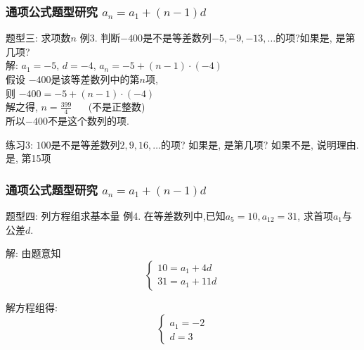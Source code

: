 \documentclass[12pt]{beamer}
\begin{document}
		\begin{frame}\frametitle{通项公式题型研究 \hspace{40pt} \alert{$a_n=a_1+(n-1)d$}}
		    
		\begin{block}{题型三: 求项数$n$}\pause
			\textcolor[rgb]{0.15,0.7,0.15}{例3.} 判断$-400$是不是等差数列$-5, -9, -13, \ldots$的项?如果是, 是第几项? \\ \pause
			{\color{cyan} 解: $a_1=-5$, \pause $d=-4$, \pause $a_n=-5+(n-1)\cdot(-4)$\\ \pause
			假设 $-400$是该等差数列中的第$n$项, \\ \pause
			则 $-400=-5+(n-1)\cdot(-4)$ \\ \pause
			解之得, $n=\frac{399}{4} \hspace{20pt}$(不是正整数) \\ \pause
			所以$-400$不是这个数列的项. 
			}
			\pause

			\textcolor[rgb]{0.15,0.7,0.15}{练习3: } $100$是不是等差数列$2, 9, 16, \ldots$的项? 如果是, 是第几项? 如果不是, 说明理由. \\ \pause
			{\color{cyan} 是, 第15项}
		\end{block}
		
		\end{frame}



		\begin{frame}\frametitle{通项公式题型研究 \hspace{40pt} \alert{$a_n=a_1+(n-1)d$}}
		    
		\begin{block}{题型四: 列方程组求基本量}\pause
			\textcolor[rgb]{0.15,0.7,0.15}{例4.} 在等差数列中,已知$a_5=10, a_{12}=31$, 求首项$a_1$与公差$d$. \\ \pause

			{\color{cyan} 解: 由题意知\\
			\[ \left\{ 
				\begin{array}{l}
					10=a_1+4d\\
					31=a_1+11d
				\end{array}
				\right. \] \pause

			解方程组得:\\
			\[ \left\{ 
				\begin{array}{l}
					a_1=-2\\
					d=3
				\end{array}
				\right. \]
			}

		\end{block}
		
		\end{frame}
\end{document}
